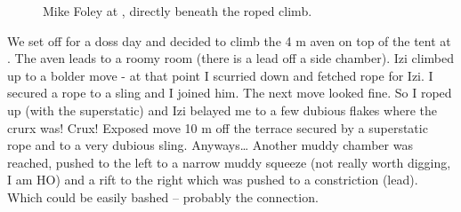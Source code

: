 \begin{figure}
\checkoddpage \ifoddpage \forcerectofloat \else \forceversofloat \fi
\centering
 \caption{Mike Foley at , directly beneath the roped  climb. }
 \label{metal aven porridge}
\end{figure}



We set off for a doss day and decided to climb the 4 m aven on top of
the tent at . The aven leads to a roomy room (there is
a lead off a side chamber). Izi climbed up to a bolder move - at that
point I scurried down and fetched rope for Izi. I secured a rope to a
sling and I joined him. The next move looked fine. So I roped up (with
the superstatic) and Izi belayed me to a few dubious flakes where the
crurx was! Crux! Exposed move 10 m off the terrace secured by a
superstatic rope and to a very dubious sling. Anyways\ldots{} Another
muddy chamber was reached, pushed to the left to a narrow muddy squeeze
(not really worth digging, I am HO) and a rift to the right which was
pushed to a constriction (lead). Which could be easily bashed --
probably the connection.



